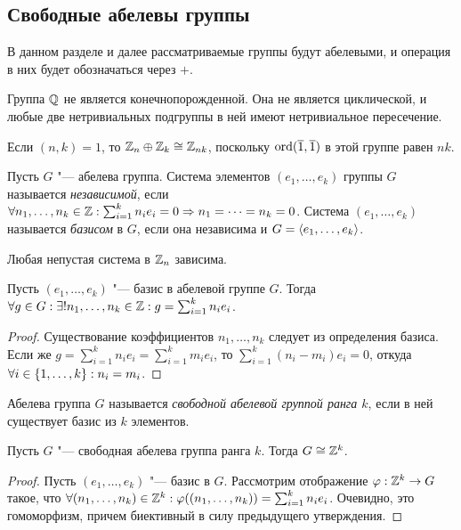 \subsection{Свободные абелевы группы}

В данном разделе и далее рассматриваемые группы будут абелевыми, и операция в них будет обозначаться через $+$.

\begin{example}
	Группа $\mathbb{Q}$ не является конечнопорожденной. Она не является циклической, и любые две нетривиальных подгруппы в ней имеют нетривиальное пересечение.
\end{example}

\begin{note}
	Если $(n, k) = 1$, то $\mathbb{Z}_n \oplus \mathbb{Z}_k \cong \mathbb{Z}_{nk}$, поскольку $\operatorname{ord}(\overline{1}, \overline{1})$ в этой группе равен $nk$.
\end{note}

\begin{definition}
	Пусть $G$ "--- абелева группа. Система элементов $(e_1, \dotsc, e_k)$ группы $G$ называется \textit{независимой}, если $\forall n_1, \dotsc, n_k \in \mathbb{Z}: \sum_{i = 1}^kn_ie_i = 0 \Rightarrow n_1 = \dotsb = n_k = 0$. Система $(e_1, \dotsc, e_k)$ называется \textit{базисом} в $G$, если она независима и $G = \langle e_1, \dotsc, e_k\rangle$.
\end{definition}

\begin{note}
	Любая непустая система в $\mathbb{Z}_n$ зависима.
\end{note}

\begin{proposition}
	Пусть $(e_1, \dotsc, e_k)$ "--- базис в абелевой группе $G$. Тогда $\forall g \in G: \exists! n_1, \dotsc, n_k \in \mathbb{Z}: g = \sum_{i = 1}^kn_ie_i$.
\end{proposition}

\begin{proof}
	Существование коэффициентов $n_1, \dotsc, n_k$ следует из определения базиса. Если же $g = \sum_{i = 1}^kn_ie_i = \sum_{i = 1}^km_ie_i$, то $\sum_{i = 1}^k(n_i - m_i)e_i = 0$, откуда $\forall i \in \{1, \dotsc, k\}: n_i \hm= m_i$.
\end{proof}

\begin{definition}
	Абелева группа $G$ называется \textit{свободной абелевой группой ранга $k$}, если в ней существует базис из $k$ элементов.
\end{definition}

\begin{proposition}
	Пусть $G$ "--- свободная абелева группа ранга $k$. Тогда $G \cong \mathbb{Z}^k$.
\end{proposition}

\begin{proof}
	Пусть $(e_1, \dotsc, e_k)$ "--- базис в $G$. Рассмотрим отображение $\varphi: \mathbb{Z}^k \to G$ такое, что $\forall (n_1, \dotsc, n_k) \in \Z^k: \phi((n_1, \dotsc, n_k)) \hm= \sum_{i = 1}^kn_ie_i$. Очевидно, это гомоморфизм, причем биективный в силу предыдущего утверждения.
\end{proof}